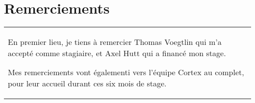 \chapter*{Remerciements}
\thispagestyle{empty}
\begin{flushleft}
  \begin{tabularx}{14cm}{X}
     En premier lieu, je tiens à remercier Thomas Voegtlin qui m'a accepté
     comme stagiaire, et Axel Hutt qui a financé mon stage.

     Mes remerciements vont égalementi vers l'équipe Cortex au complet, pour leur
     accueil durant ces six mois de stage.
  \end{tabularx}
\end{flushleft}
